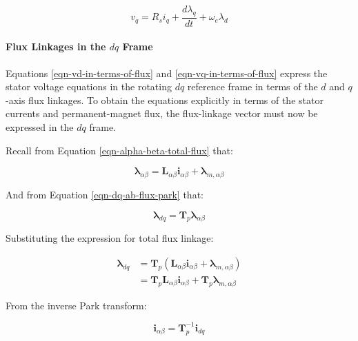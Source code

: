 \documentclass{article}
\begin{document}
\begin{equation}
\label{eqn-vq-in-terms-of-flux}
    v_q = R_si_q + \frac{d\lambda_q}{dt} + \omega_e\lambda_d
\end{equation}


\paragraph{Flux Linkages in the \texorpdfstring{$dq$}{dq} Frame}

Equations \ref{eqn-vd-in-terms-of-flux} and \ref{eqn-vq-in-terms-of-flux} express the stator voltage equations in the rotating $dq$ reference frame in terms of the $d$ and $q$-axis flux linkages. To obtain the equations explicitly in terms of the stator currents and permanent-magnet flux, the flux-linkage vector must now be expressed in the \(dq\) frame.

Recall from Equation \ref{eqn-alpha-beta-total-flux} that:

\begin{equation}
    \boldsymbol{\lambda}_{\alpha\beta} = \mathbf{L}_{\alpha\beta}\mathbf{i}_{\alpha\beta} + \boldsymbol{\lambda}_{m,\alpha\beta}
\end{equation}

And from Equation \ref{eqn-dq-ab-flux-park} that:

\begin{equation}
    \boldsymbol{\lambda}_{dq} = \mathbf{T}_p\boldsymbol{\lambda}_{\alpha\beta}
\end{equation}

Substituting the expression for total flux linkage:

\begin{align}
    \boldsymbol{\lambda}_{dq} 
    &= 
    \mathbf{T}_p(\mathbf{L}_{\alpha\beta}\mathbf{i}_{\alpha\beta} + \boldsymbol{\lambda}_{m,\alpha\beta}) \\[4pt]
    &=
    \mathbf{T}_p\mathbf{L}_{\alpha\beta}\mathbf{i}_{\alpha\beta} + \mathbf{T}_p\boldsymbol{\lambda}_{m,\alpha\beta}
\end{align}

From the inverse Park transform:

\begin{equation}
    \mathbf{i}_{\alpha\beta} = \mathbf{T}_p^{-1}\mathbf{i}_{dq}
\end{equation}
\end{document}
